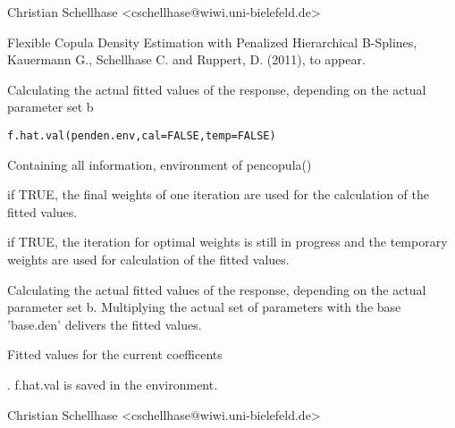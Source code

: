 \documentclass[a4paper]{book}
\begin{document}
%
\begin{Author}\relax
Christian Schellhase <cschellhase@wiwi.uni-bielefeld.de>
\end{Author}
%
\begin{References}\relax
Flexible Copula Density Estimation with Penalized
Hierarchical B-Splines, Kauermann G., Schellhase C. and Ruppert, D. (2011), to appear.
\end{References}
%
\begin{Description}\relax
Calculating the actual fitted values of the response, depending on the actual parameter set b
\end{Description}
%
\begin{Usage}
\begin{verbatim}
f.hat.val(penden.env,cal=FALSE,temp=FALSE)
\end{verbatim}
\end{Usage}
%
\begin{Arguments}
\begin{ldescription}
\item[\code{penden.env}] Containing all information, environment of pencopula()
\item[\code{cal}] if TRUE, the final weights of one iteration are used for
the calculation of the fitted values.
\item[\code{temp}] if TRUE, the iteration for optimal weights is still in
progress and the temporary weights are used for calculation of the
fitted values.
\end{ldescription}
\end{Arguments}
%
\begin{Details}\relax
Calculating the actual fitted values of the response, depending on the actual parameter set b. Multiplying the actual set of parameters  with the base 'base.den' delivers the fitted values.
\end{Details}
%
\begin{Value}
\begin{ldescription}
\item[\code{f.hat.val}] Fitted values for the current coefficents\end{ldescription}
.
f.hat.val is saved in the environment.
\end{Value}
%
\begin{Author}\relax
Christian Schellhase <cschellhase@wiwi.uni-bielefeld.de>
\end{Author}
\end{document}
